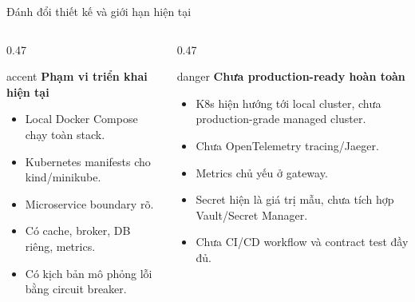 \documentclass[aspectratio=169]{beamer}
\begin{document}
\begin{frame}{Đánh đổi thiết kế và giới hạn hiện tại}
    \begin{columns}[T,onlytextwidth]
        \begin{column}{0.47\textwidth}
            \begin{claimbox}{accent}
                \textbf{Phạm vi triển khai hiện tại}
                \begin{itemize}\small
                    \item Local Docker Compose chạy toàn stack.
                    \item Kubernetes manifests cho kind/minikube.
                    \item Microservice boundary rõ.
                    \item Có cache, broker, DB riêng, metrics.
                    \item Có kịch bản mô phỏng lỗi bằng circuit breaker.
                \end{itemize}
            \end{claimbox}
        \end{column}
        \begin{column}{0.47\textwidth}
            \begin{claimbox}{danger}
                \textbf{Chưa production-ready hoàn toàn}
                \begin{itemize}\small
                    \item K8s hiện hướng tới local cluster, chưa production-grade managed cluster.
                    \item Chưa OpenTelemetry tracing/Jaeger.
                    \item Metrics chủ yếu ở gateway.
                    \item Secret hiện là giá trị mẫu, chưa tích hợp Vault/Secret Manager.
                    \item Chưa CI/CD workflow và contract test đầy đủ.
                \end{itemize}
            \end{claimbox}
        \end{column}
    \end{columns}
\end{frame}
\end{document}
